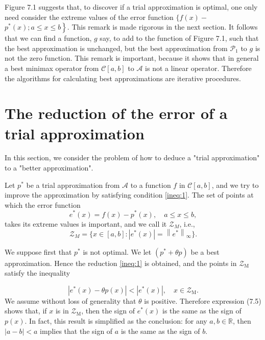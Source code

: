 \documentclass[11pt]{article}
\begin{document}
Figure 7.1 suggests that, to discover if a trial approximation is optimal, one only need consider the extreme values of the error function $\{f(x)-$ $\left.p^{*}(x) ; a \leqslant x \leqslant b\right\}$. This remark is made rigorous in the next section. It follows that we can find a function, $g$ say, to add to the function of Figure 7.1, such that the best approximation is unchanged, but the best approximation from $\mathscr{P}_{1}$ to $g$ is not the zero function. This remark is important, because it shows that in general a best minimax operator from $\mathscr{C}[a, b]$ to $\mathscr{A}$ is not a linear operator. Therefore the algorithms for calculating best approximations are iterative procedures.



\section{The reduction of the error of a trial approximation}

In this section, we consider the problem of how to deduce a "trial approximation" to a "better approximation".

Let $p^{*}$ be a trial approximation from $\mathscr{A}$ to a function $f$ in $\mathscr{C}[a, b]$, and we try to improve the approximation by satisfying condition \eqref{ineq:1}. The set of points at which the error function
\begin{equation}
e^{*}(x)=f(x)-p^{*}(x), \quad a \leqslant x \leqslant b, \label{eq:2}
\end{equation}
takes its extreme values is important, and we call it $\mathscr{Z}_{M}$, i.e., 
\begin{equation}
\mathscr{Z}_M = \{x\in [a,b]: \left|e^{*}(x)\right|=\left\|e^{*}\right\|_{\infty}\}.
\label{eq:3}
\end{equation}



We suppose first that $p^{*}$ is not optimal. We let $\left(p^{*}+\theta p\right)$ be a best approximation. Hence the reduction \eqref{ineq:1} is obtained, and the points in $\mathscr{Z}_{\mathrm{M}}$ satisfy the inequality


\begin{equation}
\left|e^{*}(x)-\theta p(x)\right|<\left|e^{*}(x)\right|, \quad x \in \mathscr{Z}_{\mathrm{M}} . \label{eq:4}
\end{equation}
We assume without loss of generality that $\theta$ is positive. Therefore expression (7.5) shows that, if $x$ is in $\mathscr{Z}_{\mathrm{M}}$, then the sign of $e^{*}(x)$ is the same as the sign of $p(x)$. In fact, this result is simplified as the conclusion: for any $a,b\in\mathbb{R}$, then $|a-b|<a$ implies that the sign of $a$ is the same as the sign of $b$.
\end{document}

